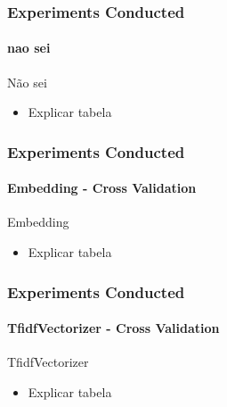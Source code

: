 \begin{frame}
	\frametitle{Experiments Conducted}
	\framesubtitle{nao sei}
	
	\begin{table}
		\centering
		\resizebox{1\textwidth}{!}{
			
		}
		\caption{nao sei}
	\end{table}

	\begin{exampleblock}{Não sei} 
		\begin{itemize}
		\item Explicar tabela
		\end{itemize}
	\end{exampleblock}

\end{frame}
\begin{frame}
	\frametitle{Experiments Conducted}
	\framesubtitle{Embedding - Cross Validation}
	
	\begin{table}
		\centering
		\resizebox{1\textwidth}{!}{
			
		}
		\caption{Embedding - Cross Validation}
	\end{table}

	\begin{exampleblock}{Embedding} 
		\begin{itemize}
			\item Explicar tabela
		\end{itemize}
	\end{exampleblock}


\end{frame}
\begin{frame}
	\frametitle{Experiments Conducted}
	\framesubtitle{TfidfVectorizer - Cross Validation}
	
	\begin{table}
		\centering
		\resizebox{1\textwidth}{!}{
			
		}
		\caption{TfidfVectorizer - Cross Validation}
	\end{table}

	\begin{exampleblock}{TfidfVectorizer} 
		\begin{itemize}
			\item Explicar tabela
		\end{itemize}
	\end{exampleblock}
	

\end{frame}
